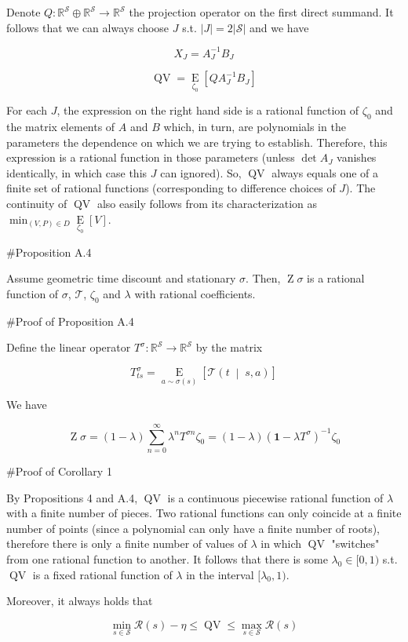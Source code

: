\documentclass[a4paper]{article}
\newcommand{\AP}[1]{\left(#1\right)}
\newcommand{\AB}[1]{\left[#1\right]}
\newcommand{\APM}[2]{\left(#1\;\middle\vert\;#2\right)}
\newcommand{\Ea}[2]{\underset{#1}{\operatorname{E}}\AB{#2}}
\newcommand{\Reals}{\mathbb{R}}
\newcommand{\Abs}[1]{\left\vert #1 \right\vert}
\newcommand{\St}{\mathcal{S}}
\newcommand{\T}{\mathcal{T}}
\newcommand{\R}{\mathcal{R}}
\newcommand{\QV}{\operatorname{QV}}
\DeclareMathOperator{\Z}{Z}
\begin{document}
Denote $Q: \Reals^\St \oplus \Reals^\St \rightarrow \Reals^\St$ the projection operator on the first direct summand. It follows that we can always choose $J$ s.t. $\Abs{J} = 2\Abs{\St}$ and we have

$$X_J = A_J^{-1} B_J$$

$$\QV = \Ea{\zeta_0}{QA_J^{-1} B_J}$$

For each $J$, the expression on the right hand side is a rational function of $\zeta_0$ and the matrix elements of $A$ and $B$ which, in turn, are polynomials in the parameters the dependence on which we are trying to establish.  Therefore, this expression is a rational function in those parameters (unless $\det A_J$ vanishes identically, in which case this $J$ can ignored). So, $\QV$ always equals one of a finite set of rational functions (corresponding to difference choices of $J$). The continuity of $\QV$ also easily follows from its characterization as $\min_{(V,P) \in D}{\Ea{\zeta_0}{V}}$.

\#Proposition A.4

Assume geometric time discount and stationary $\sigma$. Then, $\Z\sigma$ is a rational function of $\sigma$, $\T$, $\zeta_0$ and $\lambda$ with rational coefficients.

\#Proof of Proposition A.4

Define the linear operator $T^\sigma: \Reals^\St \rightarrow \Reals^\St$ by the matrix

$$T^\sigma_{ts} = \Ea{a\sim\sigma(s)}{\T\APM{t}{s,a}}$$

We have

$$\Z\sigma = (1-\lambda)\sum_{n=0}^\infty \lambda^n T^{\sigma n} \zeta_0 = (1-\lambda)\AP{\boldsymbol{1}-\lambda T^\sigma}^{-1}\zeta_0$$

\#Proof of Corollary 1

By Propositions 4 and A.4, $\QV$ is a continuous piecewise rational function of $\lambda$ with a finite number of pieces. Two rational functions can only coincide at a finite number of points (since a polynomial can only have a finite number of roots), therefore there is only a finite number of values of $\lambda$ in which $\QV$ "switches" from one rational function to another. It follows that there is some $\lambda_0\in[0,1)$ s.t. $\QV$ is a fixed rational function of $\lambda$ in the interval $[\lambda_0,1)$.

Moreover, it always holds that

$$\min_{s\in\St} \R(s) - \eta \leq \QV \leq \max_{s\in\St} \R(s)$$
\end{document}
